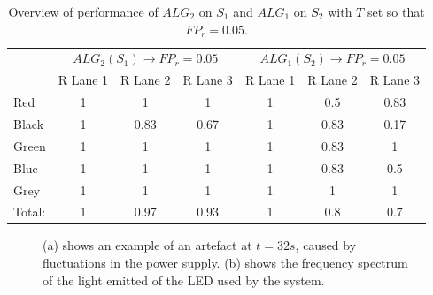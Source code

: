 \begin{table}[]
	\centering
	\begin{tabular}{l|ccc|ccc}
	& \multicolumn{3}{c|}{$ALG_2(S_1) \rightarrow FP_r = 0.05$} & \multicolumn{3}{c}{$ALG_1(S_2) \rightarrow FP_r = 0.05$} \\
		& R Lane 1             & R Lane 2             & R Lane 3             & R Lane 1           & R Lane 2           & R Lane 3          \\ \hline
		Red    & 1                    & 1                    & 1                    & 1                  & 0.5                & 0.83              \\
		Black  & 1                    & 0.83                 & 0.67                 & 1                  & 0.83               & 0.17              \\
		Green  & 1                    & 1                    & 1                    & 1                  & 0.83               & 1                 \\
		Blue   & 1                    & 1                    & 1                    & 1                  & 0.83               & 0.5               \\
		Grey   & 1                    & 1                    & 1                    & 1                  & 1                  & 1                 \\ \hline
		Total: & 1                    & 0.97                 & 0.93                 & 1                  & 0.8                & 0.7              
	\end{tabular}
	\caption{Overview of performance of $ALG_2$ on $S_1$ and $ALG_1$ on $S_2$ with $T$ set so that $FP_r = 0.05$.\label{tbl:P=0.95}}
\end{table}

\begin{figure}
	\centering     %
	\caption{(a) shows an example of an artefact at $t = 32s$, caused by fluctuations in the power supply. (b) shows the frequency spectrum of the light emitted of the LED used by the system.\label{fig:explanations}}
\end{figure}

